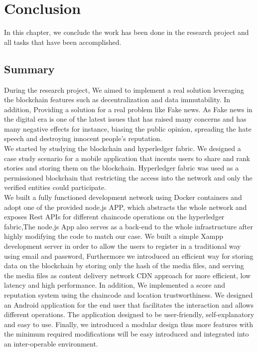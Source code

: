 \chapter {Conclusion}

In this chapter, we conclude the work has been done in the research project and all tasks that have been accomplished.

\section{Summary}
During the research project, We aimed to implement a real solution leveraging the blockchain features such as decentralization and data immutability.
In addition, Providing a solution for a real problem like Fake news. As Fake news in the digital era is one of the latest issues that has raised many concerns and has many negative effects for instance, biasing the public opinion, spreading the hate speech and destroying innocent people's reputation. \\ 

\noindent We started by studying the blockchain and hyperledger fabric. We designed a case study scenario for a mobile application that incents users to share and rank stories and storing them on the blockchain. Hyperledger fabric was used as a permissioned blockchain that restricting the access into the network and only the verified entities could participate. \\ 
 
\noindent We built a fully functioned development network using Docker containers and adopt one of the provided node.js APP, which abstracts the whole network and exposes Rest APIs for different chaincode operations on the hyperledger fabric,The node.js App also serves as a back-end to the whole infrastructure after highly modifying the code to match our case. 
We built a simple Xampp development server in order to allow the users to register in a traditional way using email and password, Furthermore we introduced an efficient way for storing data on the blockchain by storing only the hash of the media files, and serving the media files as content delivery network CDN approach for more efficient, low latency and high performance. 
In addition, We implemented a score and reputation system using the chaincode and location trustworthiness.  We designed an Android application for the end user that facilitates the interaction and allows different operations. The application designed to be user-friendly, self-explanatory and easy to use. Finally, we introduced a modular design thus more features with the minimum required modifications will be easy introduced and integrated into an inter-operable environment.